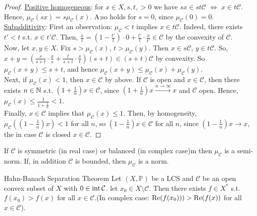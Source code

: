 \documentclass{article}
\begin{document}
\begin{proof}
    \noindent\underline{Positive homogeneous}: for $x\in X, s,t, >0$ we have $sx\in st\mathcal{C}$ $\iff$ $x\in t\mathcal{C}$. Hence, $\mu_{\mathcal{C}}(sx) = s\mu_{\mathcal{C}}(x)$. A;so holds for $s=0$, since $\mu_{\mathcal{C}}(0)=0$.\\

    \noindent\underline{Subadditivity}: First an observation: $\mu_{\mathcal{C}}<t$ implies $x\in t\mathcal{C}$. Indeed, there exists $t'<t$ s.t. $x\in t'\mathcal{C}$. Then, $\frac{x}{t} = (1-\frac{t'}{t})\cdot 0 + \frac{t'}{t}\cdot\frac{x}{t'}\in \mathcal{C}$ by the convexity of $\mathcal{C}$.\\
    
    Now, let $x,y\in X$. Fix $s>\mu_{\mathcal{C}}(x)$, $t>\mu_{\mathcal{C}}(y)$. Then $x\in s\mathcal{C}$, $y\in t\mathcal{C}$. So, $x+y = \left(\frac{s}{s+t}\cdot \frac{x}{s}+\frac{t}{s+t}\cdot\frac{x}{t}\right)(s+t)\in (s+t)\mathcal{C}$ by convexity. So $\mu_{\mathcal{C}}(x+y)\leq s+t$, and hence $\mu_{\mathcal{C}}(x+y)\leq \mu_{\mathcal{C}}(x)+\mu_{\mathcal{C}}(y)$.\\

    Next, if $\mu_{\mathcal{C}}(x)<1$, then $x\in \mathcal{C}$ by above. If $\mathcal{C}$ is open and $x\in \mathcal{C}$, then there exists $n\in \mathbb{N}$ s.t. $(1+\frac{1}{n})x\in \mathcal{C}$, since $(1+\frac{1}{n})x\xrightarrow{n\to\infty}x$ and $\mathcal{C}$ open. Hence, $\mu_{\mathcal{C}}(x)\leq \frac{1}{1+\frac{1}{n}}<1$.\\

    Finally, $x\in \mathcal{C}$ implies that $\mu_{\mathcal{C}}(x)\leq 1$. Then, by homogeneity, $\mu_{\mathcal{C}}((1-\frac{1}{n})x)<1$ for all $n$, so $(1-\frac{1}{n})x\in  \mathcal{C}$ for all $n$, since $(1-\frac{1}{n})x\to x$, the in case $ \mathcal{C}$ is closed $x\in  \mathcal{C}$.
\end{proof}

\begin{remark}
    If $ \mathcal{C}$ is symmetric (in real case) or balanced (in complex case)m then $\mu_{\mathcal{C}}$ is a semi-norm. If, in addition $\mathcal{C}$ is bounded, then $\mu_{\mathcal{C}}$ is a norm.
\end{remark}

\begin{theorem}{Hahn-Banach Separation Theorem}\label{thm: Hahn-Banach separation theorem}
    Let $(X, \mathbb{P})$ be a LCS and $\mathcal{C}$ be an open convex subset of $X$ with $0\in \operatorname{int}\mathcal{C}$. let $x_0 \in X\setminus \mathcal{C}$. Then there exists $f\in X^*$ s.t. $f(x_0)>f(x)$ for all $x\in \mathcal{C}$.(In complex case: $\operatorname{Re}(f(x_0)))>\operatorname{Re}(f(x))$ for all $x\in \mathcal{C}$).
    
\end{theorem}
\end{document}
